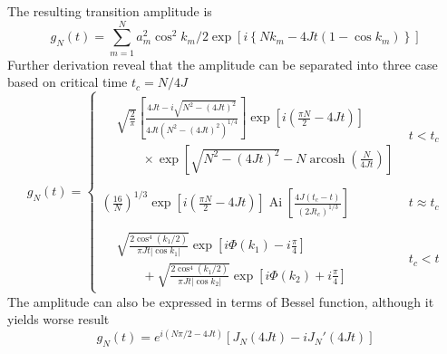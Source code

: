 \documentclass[../../../main.tex]{subfiles}
\begin{document}
The resulting transition amplitude is
\begin{equation*}
    g_N(t) = \sum_{m =1} ^{N} a_m ^ 2\cos^2 k_m/2 \exp \left[i \left\{Nk_m - 4Jt (1-\cos k_m)  \right\}  \right]
\end{equation*}
Further derivation reveal that the amplitude can be separated into three case based on critical time $t_c = N/4J$
\begin{equation*}
    g_N(t) =
    \begin{cases}
        \begin{aligned}
             & \sqrt{\frac{2}{\pi}} \left[ \frac{4Jt - i \sqrt{N^2 - (4Jt)^2}}{4Jt \left( N^2 - (4Jt)^2 \right)^{1/4}} \right]
            \exp\left[ i\left( \frac{\pi N}{2} - 4Jt \right) \right]                                                           \\
             & \qquad \times \exp\left[\sqrt{N^2 - (4Jt)^2} -N \operatorname{arcosh} \left(\frac{N}{4Jt}\right)  \right]
        \end{aligned}
         & t<t_c         \\\\
        \left(\frac{16}{N}\right)^{1/3} \exp \left[ i \left( \frac{\pi N}{2} - 4Jt \right) \right] \operatorname{Ai}\left[ \frac{4J(t_c - t) }{(2Jt_c)^{1/3}}   \right]
         & t \approx t_c \\\\
        \begin{aligned}
             & \sqrt{\frac{2 \cos^4 (k_1/2)}{\pi Jt |\cos k_1|}} \exp \left[ i\Phi(k_1) -i \frac{\pi }{4}\right]           \\
             & \qquad + \sqrt{\frac{2 \cos^4 (k_1/2)}{\pi Jt |\cos k_2|}} \exp \left[i\Phi(k_2) +i \frac{\pi }{4}  \right]
        \end{aligned}
         & t_c <t
    \end{cases}
\end{equation*}
The amplitude can also be expressed in terms of Bessel function, although it yields worse result
\begin{equation*}
    g_N(t)
    = e^{i(N\pi/2 -4Jt)}  \left[ J_{N}(4Jt) -i  J_N' (4Jt)\right]
\end{equation*}
\end{document}
